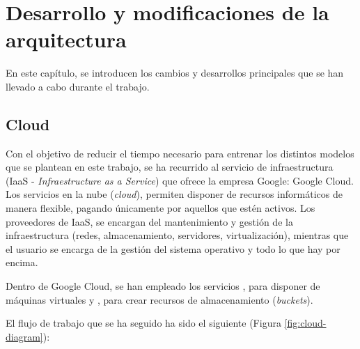 \section{Desarrollo y modificaciones de la arquitectura}

En este capítulo, se introducen los cambios y desarrollos principales que se han llevado a cabo durante el trabajo.

\subsection{Cloud} 

Con el objetivo de reducir el tiempo necesario para entrenar los distintos modelos que se plantean en este trabajo, se ha recurrido al servicio de infraestructura (IaaS - \textit{Infraestructure as a Service}) que ofrece la empresa Google: Google Cloud. Los servicios en la nube (\textit{cloud}), permiten disponer de recursos informáticos de manera flexible, pagando únicamente por aquellos que estén activos. Los proveedores de IaaS, se encargan del mantenimiento y gestión de la infraestructura (redes, almacenamiento, servidores, virtualización), mientras que el usuario se encarga de la gestión del sistema operativo y todo lo que hay por encima. 

Dentro de Google Cloud, se han empleado los servicios , para disponer de máquinas virtuales y , para crear recursos de almacenamiento (\textit{buckets}).

El flujo de trabajo que se ha seguido ha sido el siguiente (Figura \ref{fig:cloud-diagram}):

